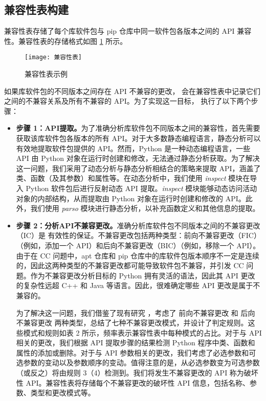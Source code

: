 \subsection{兼容性表构建}\label{4.1.3}
兼容性表存储了每个库软件包与 pip 仓库中同一软件包各版本之间的 API 兼容性。兼容性表的存储格式如图 \ref{fig:compatibility} 所示。
\begin{figure}[htbp] %
	\centering
	\texttt{[image: 兼容性表]}
	\caption{兼容性表示例}
	\label{fig:compatibility}
\end{figure}如果库软件包的不同版本之间存在 API 不兼容的更改，\tool{} 会在兼容性表中记录它们之间的不兼容关系及所有不兼容的 API。为了实现这一目标，\tool{} 执行了以下两个步骤：
\begin{itemize}
	\item \textbf{步骤 1：API提取。}为了准确分析库软件包不同版本之间的兼容性，首先需要获取该库软件包各版本的所有 API。对于大多数静态编程语言，静态分析可以有效地提取软件包提供的 API。然而，Python 是一种动态编程语言，一些 API 由 Python 对象在运行时创建和修改，无法通过静态分析获取。为了解决这一问题，我们采用了动态分析与静态分析相结合的策略来提取 API，涵盖了类、函数（及其参数）和属性等。在动态分析中，我们使用 \textit{inspect} 模块在导入 Python 软件包后进行反射动态 API 提取。\textit{inspect} 模块能够动态访问活动对象的内部结构，从而提取由 Python 对象在运行时创建和修改的 API。此外，我们使用 \textit{parso}  模块进行静态分析，以补充函数定义和其他信息的提取。
	
	
	\item \textbf{步骤 2：分析API不兼容更改。}准确分析库软件包不同版本之间的不兼容更改（IC）是 \tool{}有效性的保证。不兼容更改包括两种类型：前向不兼容更改（FIC）（例如，添加一个 API）和后向不兼容更改（BIC）（例如，移除一个 API）。由于在 CC 问题中，apt 仓库和 pip 仓库中的库软件包版本顺序不一定是连续的，因此这两种类型的不兼容更改都可能导致软件包不兼容，并引发 CC 问题。作为不兼容更改分析目标的 Python 拥有灵活的语法，因此其 API 更改的复杂性远超 C++ 和 Java 等语言。因此，很难确定哪些 API 更改是属于不兼容的。
	
	为了解决这一问题，我们借鉴了现有研究 \cite{zhang2020python}，考虑了 前向不兼容更改 和 后向不兼容更改 两种类型，总结了七种不兼容更改模式，并设计了判定规则。这些模式和规则如表 2 所示，频率表示兼容性表中每种模式的占比。对于与 API 相关的更改，我们根据 API 提取步骤的结果检测 Python 程序中类、函数和属性的添加或删除。对于与 API 参数相关的更改，我们考虑了必选参数和可选参数的变动以及参数顺序的变动。值得注意的是，从必选参数变为可选参数（或反之）将由规则 3（4）检测到。我们将发生不兼容更改的 API 称为破坏性 API。兼容性表将存储每个不兼容更改的破坏性 API 信息，包括名称、参数、类型和更改模式等。

\end{itemize}

